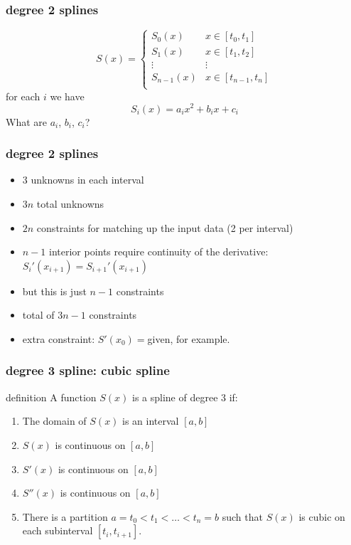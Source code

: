 \documentclass[10pt]{beamer}
\begin{document}
\begin{frame}
\frametitle{degree 2 splines}
\begin{equation*}
  S(x) = \begin{cases}
  S_0(x) &  x\in[t_0,t_1]\\
  S_1(x) &  x\in[t_1,t_2]\\
  \vdots & \vdots \\
  S_{n-1}(x) &  x\in[t_{n-1},t_n]\\
\end{cases}
\end{equation*}
for each $i$ we have
\begin{equation*}
  S_i(x) = a_i x^2 + b_i x + c_i
\end{equation*}
What are $a_i$, $b_i$, $c_i$?
\end{frame}
\begin{frame}
\frametitle{degree 2 splines}
\begin{itemize}
  \item 3 unknowns in each interval
  \item $3n$ total unknowns
  \item $2n$ constraints for matching up the input data (2 per interval)
  \item $n-1$ interior points require continuity of the derivative:
$S_{i}'(x_{i+1}) = S_{i+1}'(x_{i+1})$
  \item but this is just $n-1$ constraints
  \item total of $3n-1$ constraints
  \item extra constraint: $S'(x_0)=$given, for example.
\end{itemize}
\end{frame}
\begin{frame}
\frametitle{degree 3 spline: cubic spline}
\begin{block}{definition}
A function $S(x)$ is a spline of degree 3 if:
\begin{enumerate}
  \item The domain of $S(x)$ is an interval $[a,b]$
  \item $S(x)$ is continuous on $[a,b]$
  \item $S'(x)$ is continuous on $[a,b]$
  \item $S''(x)$ is continuous on $[a,b]$
  \item There is a partition $a=t_0<t_1<\dots<t_n=b$ such that $S(x)$ is
cubic on each subinterval $[t_i,t_{i+1}]$.
\end{enumerate}
\end{block}
\end{frame}
\end{document}
